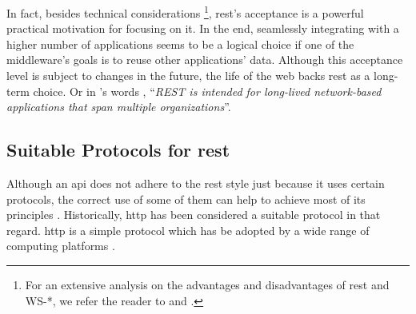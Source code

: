 In fact, besides technical considerations
\footnote{For an extensive analysis on the advantages and disadvantages of \ac{rest} and WS-*, we refer the reader to \citep{pautasso_restful_2008} and \citep{guinard_search_2011}.},
\ac{rest}'s acceptance is a powerful practical motivation for focusing on it.
In the end, seamlessly integrating with a higher number of applications seems to be a logical choice if one of the middleware's goals is to reuse other applications' data. %
Although this acceptance level is subject to changes in the future, the life of the web backs \ac{rest} as a long-term choice.
Or in \citeauthor{fielding_architectural_2000}'s words \cite[comment 21]{fielding_rest_2008},
``\emph{REST is intended for long-lived network-based applications that span multiple organizations}''.



\subsection{Suitable Protocols for \acs{rest}}
\label{sec:protocols}

Although an \ac{api} does not adhere to the \ac{rest} style just because it uses certain protocols,
the correct use of some of them can help to achieve most of its principles \citep{moore_hypermedia_2010}.
Historically, \ac{http} has been considered a suitable protocol in that regard.
\ac{http} is a simple protocol which has be adopted by a wide range of computing platforms \citep{yazar_efficient_2009,hammel_mongoose:_2010}.


